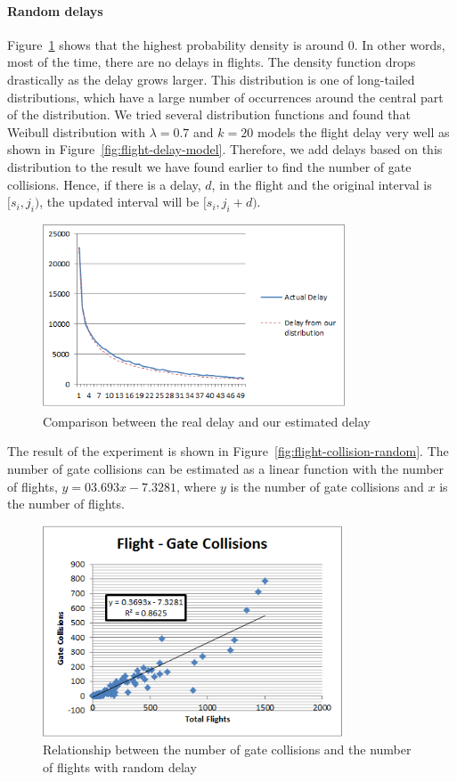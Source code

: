 \documentclass[11pt,a4paper]{article}
\begin{document}
\paragraph{Random delays} Figure~\ref{fig:flight-delay-distribution} shows that the highest probability density is around 0. In other words, most of the time, there are no delays in flights. The density function drops drastically as the delay grows larger. This distribution is one of long-tailed distributions, which have a large number of occurrences around the central part of the distribution. We tried several distribution functions and found that Weibull distribution with $\lambda = 0.7$ and $k = 20$ models the flight delay very well as shown in Figure~\ref{fig:flight-delay-model}. Therefore, we add delays based on this distribution to the result we have found earlier to find the number of gate collisions. Hence, if there is a delay, $d$, in the flight and the original interval is $[s_i, j_i)$, the updated interval will be $[s_i, j_i+d)$. \par
\begin{figure}
    \centering
    \includegraphics[width=0.8\textwidth]{img-flight-delay-distribution.png}
    \caption{Comparison between the real delay and our estimated delay}
    \label{fig:flight-delay-distribution}
\end{figure}
The result of the experiment is shown in Figure~\ref{fig:flight-collision-random}. The number of gate collisions can be estimated as a linear function with the number of flights, $y = 03.693x-7.3281$, where $y$ is the number of gate collisions and $x$ is the number of flights. \par
\begin{figure}
    \centering
    \includegraphics[width=0.8\textwidth]{img-flight-collision-random.png}
    \caption{Relationship between the number of gate collisions and the number of flights with random delay}
    \label{fig:gate-flight-collision-random}
\end{figure}
\end{document}
